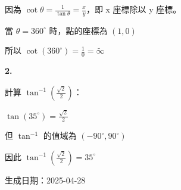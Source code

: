 \documentclass[a4paper,11pt]{article}
\newcommand{\explanationbox}[1]{%
  \begin{tcolorbox}[explanationstyle]
    #1
  \end{tcolorbox}
}
\begin{document}
\begin{multicols}{2}
{\begin{minipage}{\linewidth}
\begin{wrapfigure}{r}{0.45\linewidth}
{
      }
      \vspace{-1.5em}
    \end{wrapfigure}
    \vspace{0.5em}
    因為 $\cot \theta = \frac{1}{\tan \theta} = \frac{x}{y}$，即 x 座標除以 y 座標。
    
    當 $\theta = 360^\circ$ 時，點的座標為 $(1, 0)$
    
    所以 $\cot(360^\circ) = \frac{1}{0} = \tilde{\infty}$
  \end{minipage}
}

\explanationbox{\textbf{2.} 
  \begin{minipage}{\linewidth}
    計算 $\tan^{-1}\left(\frac{\sqrt{2}}{2}\right)$：
    
    $\tan(35^\circ) = \frac{\sqrt{2}}{2}$
    
    但 $\tan^{-1}$ 的值域為 $(-90^\circ, 90^\circ)$
    
    因此 $\tan^{-1}\left(\frac{\sqrt{2}}{2}\right) = 35^\circ$
  \end{minipage}
}

\end{multicols}

\vfill
\begin{center}
\small{生成日期：2025-04-28}
\end{center}
\end{document}
